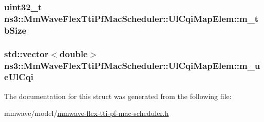 \subsubsection[{\texorpdfstring{m\+\_\+tb\+Size}{m_tbSize}}]{\setlength{\rightskip}{0pt plus 5cm}uint32\+\_\+t ns3\+::\+Mm\+Wave\+Flex\+Tti\+Pf\+Mac\+Scheduler\+::\+Ul\+Cqi\+Map\+Elem\+::m\+\_\+tb\+Size}\hypertarget{structns3_1_1MmWaveFlexTtiPfMacScheduler_1_1UlCqiMapElem_a93f9bfc2fe75d6fecbbe0787dd6031ac}{}\label{structns3_1_1MmWaveFlexTtiPfMacScheduler_1_1UlCqiMapElem_a93f9bfc2fe75d6fecbbe0787dd6031ac}
\subsubsection[{\texorpdfstring{m\+\_\+ue\+Ul\+Cqi}{m_ueUlCqi}}]{\setlength{\rightskip}{0pt plus 5cm}std\+::vector$<$double$>$ ns3\+::\+Mm\+Wave\+Flex\+Tti\+Pf\+Mac\+Scheduler\+::\+Ul\+Cqi\+Map\+Elem\+::m\+\_\+ue\+Ul\+Cqi}\hypertarget{structns3_1_1MmWaveFlexTtiPfMacScheduler_1_1UlCqiMapElem_a9fc2297f7aca6aff6ced11aa00d15ca6}{}\label{structns3_1_1MmWaveFlexTtiPfMacScheduler_1_1UlCqiMapElem_a9fc2297f7aca6aff6ced11aa00d15ca6}


The documentation for this struct was generated from the following file\+:\begin{DoxyCompactItemize}
\item 
mmwave/model/\hyperlink{mmwave-flex-tti-pf-mac-scheduler_8h}{mmwave-\/flex-\/tti-\/pf-\/mac-\/scheduler.\+h}\end{DoxyCompactItemize}
